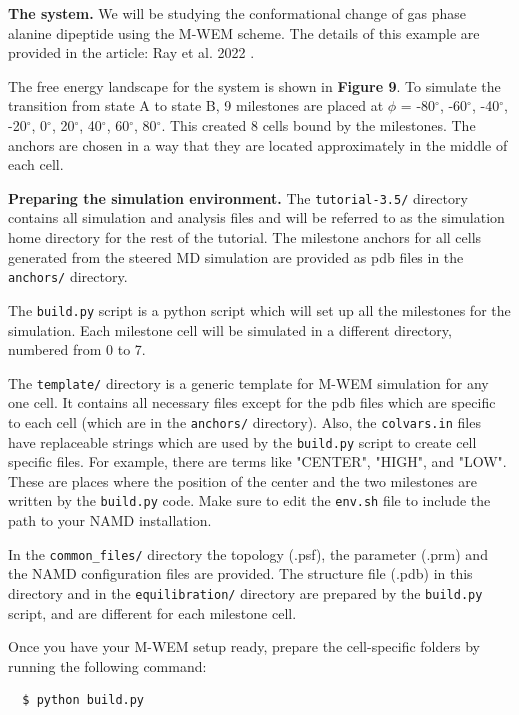 \textbf{The system.} We will be studying the conformational change of gas phase alanine dipeptide using the M-WEM scheme. 
The details of this example are provided in the article: Ray et al. 2022 \citep{Ray2022Markovian}. 

The free energy landscape for the system is shown in \textbf{Figure 9}. 
To simulate the transition from state A to state B, 9 milestones are placed at $\phi$ = -80$^{\circ}$,  -60$^{\circ}$, -40$^{\circ}$, -20$^{\circ}$, 0$^{\circ}$, 20$^{\circ}$, 40$^{\circ}$, 60$^{\circ}$, 80$^{\circ}$. 
This created 8 cells bound by the milestones. 
The anchors are chosen in a way that they are located approximately in the middle of each cell.

\textbf{Preparing the simulation environment.} The \verb|tutorial-3.5/| directory contains all simulation and analysis files and will be referred to as the simulation home directory for the rest of the tutorial. 
The milestone anchors for all cells generated from the steered MD simulation are provided as pdb files in the \verb|anchors/| directory. 

The \verb|build.py| script is a python script which will set up all the milestones for the simulation. 
Each milestone cell will be simulated in a different directory, numbered from 0 to 7. 

The \verb|template/| directory is a generic template for M-WEM simulation for any one cell. 
It contains all necessary files except for the pdb files which are specific to each cell (which are in the \verb|anchors/| directory). 
Also, the \verb|colvars.in| files have replaceable strings which are used by the \verb|build.py| script to create cell specific files. 
For example, there are terms like "CENTER", "HIGH", and "LOW". These are places where the position of the center and the two milestones are written by the \verb|build.py| code. 
Make sure to edit the \verb|env.sh| file to include the path to your NAMD installation.

In the \verb|common_files/| directory the topology (.psf), the parameter (.prm) and the NAMD configuration files are provided. 
The structure file (.pdb) in this directory and in the \verb|equilibration/| directory are prepared by the \verb|build.py| script, and are different for each milestone cell. 

Once you have your M-WEM setup ready, prepare the cell-specific folders by running the following command:

\begin{verbatim}
  $ python build.py
\end{verbatim}

